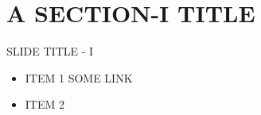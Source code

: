 


\maketitle
\section{A SECTION-I TITLE}
\begin{frame}[t]{SLIDE TITLE - I}
    \begin{itemize}
      \item ITEM 1
      SOME LINK
      \item ITEM 2
    \end{itemize}

\end{frame}


